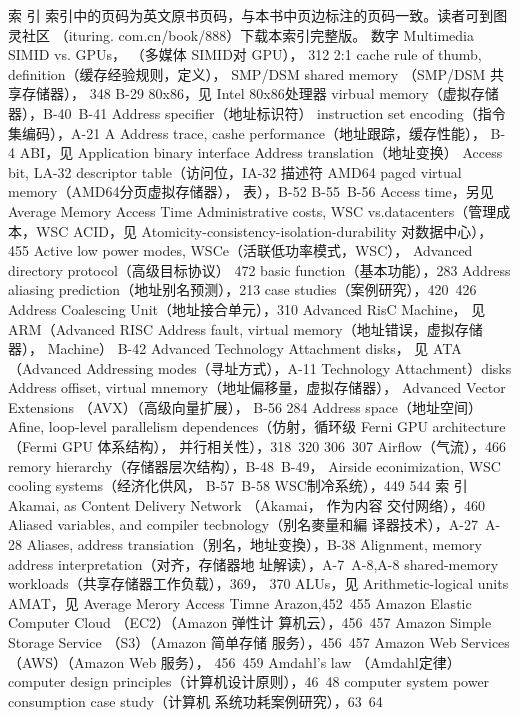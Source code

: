 索
引
索引中的页码为英文原书页码，与本书中页边标注的页码一致。读者可到图灵社区 （ituring.
com.cn/book/888）下载本索引完整版。
数字
Multimedia SIMID vs. GPUs， （多媒体 SIMID对 GPU），
312
2:1 cache rule of thumb, definition（缓存经验规则，定义），
SMP/DSM shared memory （SMP/DSM 共享存储器），
348
B-29
80x86，见 Intel 80x86处理器
virbual memory（虚拟存储器），B-40~B-41
Address specifier（地址标识符）
instruction set encoding（指令集编码），A-21
A
Address trace, cashe performance（地址跟踪，缓存性能），
B-4
ABI，见 Application binary interface
Address translation（地址变换）
Access bit, LA-32 descriptor table（访问位，IA-32 描述符
AMD64 pagcd virtual memory（AMD64分页虚拟存储器），
表），B-52
B-55~B-56
Access time，另见 Average Memory Access Time
Administrative costs, WSC vs.datacenters（管理成本，WSC
ACID，见 Atomicity-consistency-isolation-durability
对数据中心），455
Active low power modes, WSCe（活联低功率模式，WSC）， Advanced directory protocol（高级目标协议）
472
basic function（基本功能），283
Address aliasing prediction（地址别名预测），213
case studies（案例研究），420~426
Address Coalescing Unit（地址接合单元），310
Advanced RisC Machine， 见 ARM（Advanced RISC
Address fault, virtual memory（地址错误，虚拟存储器），
Machine）
B-42
Advanced Technology Attachment disks， 见 ATA （Advanced
Addressing modes（寻址方式），A-11
Technology Attachment）disks
Address offiset, virtual mnemory（地址偏移量，虚拟存储器），
Advanced Vector Extensions （AVX）（高级向量扩展），
B-56
284
Address space（地址空间）
Afine, loop-level parallelism dependences（仿射，循环级
Ferni GPU architecture （Fermi GPU 体系结构），
并行相关性），318~320
306~307
Airflow（气流），466
remory hierarchy（存储器层次结构），B-48~B-49，
Airside econimization, WSC cooling systems（经济化供风，
B-57~B-58
WSC制冷系统），449
544
索
引
Akamai, as Content Delivery Network （Akamai， 作为内容
交付网络），460
Aliased variables, and compiler tecbnology（别名麥量和編
译器技术），A-27~A-28
Aliases, address transiation（别名，地址变換），B-38
Alignment, memory address interpretation（对齐，存储器地
址解读），A-7~A-8,A-8
shared-memory workloads（共享存储器工作负载），369，
370
ALUs，见 Arithmetic-logical units
AMAT，见 Average Merory Access Timne
Arazon,452~455
Amazon Elastic Computer Cloud （EC2）（Amazon 弹性计
算机云），456~457
Amazon Simple Storage Service （S3）（Amazon 简单存储
服务），456~457
Amazon Web Services （AWS）（Amazon Web 服务），
456~459
Amdahl's law （Amdahl定律）
computer design principles（计算机设计原则），46~48
computer system power consumption case study（计算机
系统功耗案例研究），63~64
